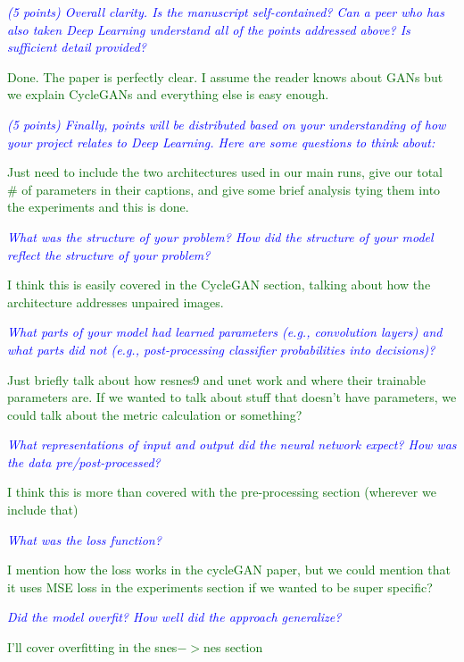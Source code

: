 \documentclass[10pt,twocolumn,letterpaper]{article}
\begin{document}
\textit{\textcolor{blue}{(5 points) Overall clarity. Is the manuscript self-contained? Can a peer who has also taken Deep Learning understand all of the points addressed above? Is sufficient detail provided?}}

\textcolor{darkgreen}{Done. The paper is perfectly clear. I assume the reader knows about GANs but we explain CycleGANs and everything else is easy enough.}

\textit{\textcolor{blue}{(5 points) Finally, points will be distributed based on your understanding of how your project relates to Deep Learning. Here are some questions to think about:}}

\textcolor{darkgreen}{Just need to include the two architectures used in our main runs, give our total \# of parameters in their captions, and give some brief analysis tying them into the experiments and this is done.}

\textit{\textcolor{blue}{What was the structure of your problem? How did the structure of your model reflect the structure of your problem?}}

\textcolor{darkgreen}{I think this is easily covered in the CycleGAN section, talking about how the architecture addresses unpaired images.}

\textit{\textcolor{blue}{What parts of your model had learned parameters (e.g., convolution layers) and what parts did not (e.g., post-processing classifier probabilities into decisions)? }}

\textcolor{darkgreen}{Just briefly talk about how resnes9 and unet work and where their trainable parameters are. If we wanted to talk about stuff that doesn't have parameters, we could talk about the metric calculation or something?}

\textit{\textcolor{blue}{What representations of input and output did the neural network expect? How was the data pre/post-processed?}}

\textcolor{darkgreen}{I think this is more than covered with the pre-processing section (wherever we include that)}

\textit{\textcolor{blue}{What was the loss function?}}

\textcolor{darkgreen}{I mention how the loss works in the cycleGAN paper, but we could mention that it uses MSE loss in the experiments section if we wanted to be super specific?}

\textit{\textcolor{blue}{Did the model overfit? How well did the approach generalize?}}

\textcolor{darkgreen}{I'll cover overfitting in the snes$->$nes section}
\end{document}
